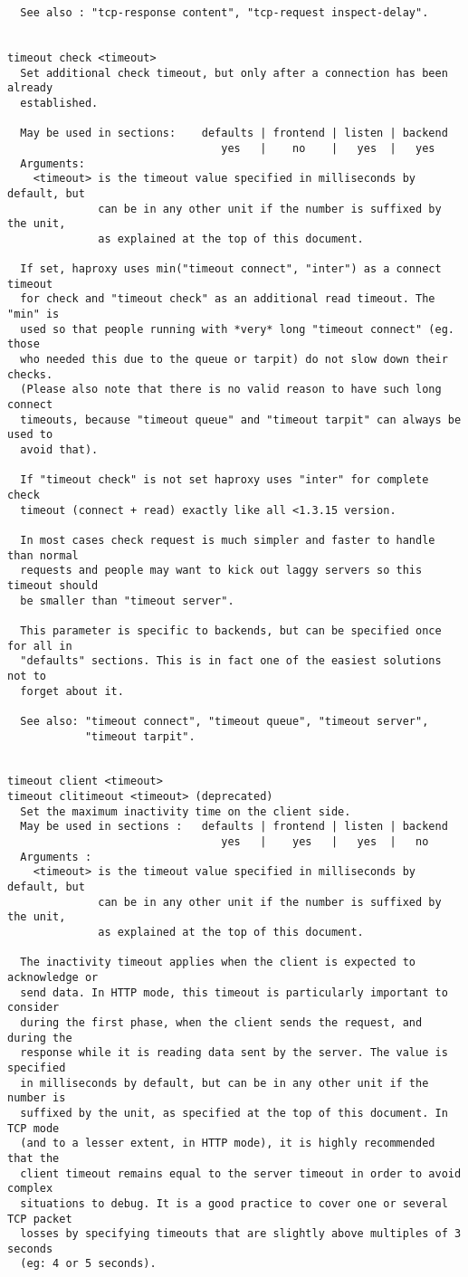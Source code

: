 \begin{verbatim}
  See also : "tcp-response content", "tcp-request inspect-delay".


timeout check <timeout>
  Set additional check timeout, but only after a connection has been already
  established.

  May be used in sections:    defaults | frontend | listen | backend
                                 yes   |    no    |   yes  |   yes
  Arguments:
    <timeout> is the timeout value specified in milliseconds by default, but
              can be in any other unit if the number is suffixed by the unit,
              as explained at the top of this document.

  If set, haproxy uses min("timeout connect", "inter") as a connect timeout
  for check and "timeout check" as an additional read timeout. The "min" is
  used so that people running with *very* long "timeout connect" (eg. those
  who needed this due to the queue or tarpit) do not slow down their checks.
  (Please also note that there is no valid reason to have such long connect
  timeouts, because "timeout queue" and "timeout tarpit" can always be used to
  avoid that).

  If "timeout check" is not set haproxy uses "inter" for complete check
  timeout (connect + read) exactly like all <1.3.15 version.

  In most cases check request is much simpler and faster to handle than normal
  requests and people may want to kick out laggy servers so this timeout should
  be smaller than "timeout server".

  This parameter is specific to backends, but can be specified once for all in
  "defaults" sections. This is in fact one of the easiest solutions not to
  forget about it.

  See also: "timeout connect", "timeout queue", "timeout server",
            "timeout tarpit".


timeout client <timeout>
timeout clitimeout <timeout> (deprecated)
  Set the maximum inactivity time on the client side.
  May be used in sections :   defaults | frontend | listen | backend
                                 yes   |    yes   |   yes  |   no
  Arguments :
    <timeout> is the timeout value specified in milliseconds by default, but
              can be in any other unit if the number is suffixed by the unit,
              as explained at the top of this document.

  The inactivity timeout applies when the client is expected to acknowledge or
  send data. In HTTP mode, this timeout is particularly important to consider
  during the first phase, when the client sends the request, and during the
  response while it is reading data sent by the server. The value is specified
  in milliseconds by default, but can be in any other unit if the number is
  suffixed by the unit, as specified at the top of this document. In TCP mode
  (and to a lesser extent, in HTTP mode), it is highly recommended that the
  client timeout remains equal to the server timeout in order to avoid complex
  situations to debug. It is a good practice to cover one or several TCP packet
  losses by specifying timeouts that are slightly above multiples of 3 seconds
  (eg: 4 or 5 seconds).


\end{verbatim}
